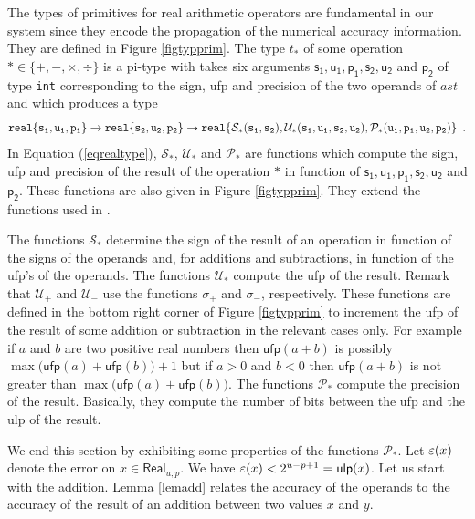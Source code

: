  
The types of primitives for real arithmetic operators are fundamental in our system since they encode
the propagation of the numerical accuracy information. They are defined in Figure \ref{figtypprim}.
The type $t_\ast$ of some operation $\ast\in\{+,-,\times,\div\}$ is a pi-type with takes
six arguments $\mathsf{s_1,u_1,p_1,s_2,u_2}$ and $\mathsf{p_2}$ of type \texttt{int} corresponding to the sign, \textsf{ufp} and precision of
the two operands of $ast$ and which produces a type
\begin{equation}\label{eqrealtype}
\mathtt{real\{s_1,u_1,p_1\}}\rightarrow\mathtt{real\{s_2,u_2,p_2\}}
\rightarrow\mathtt{real\{\mathcal{S}_\ast(\mathtt{s_1},\mathtt{s_2}),\mathcal{U}_\ast(\mathtt{s_1},\mathtt{u_1},\mathtt{s_2},\mathtt{u_2}),\mathcal{P}_\ast(\mathtt{u_1},\mathtt{p_1},\mathtt{u_2},\mathtt{p_2})\}}\enspace .
\end{equation}
In Equation (\ref{eqrealtype}), $\mathcal{S}_\ast$, $\mathcal{U}_\ast$ and $\mathcal{P}_\ast$
are functions which compute the sign, \textsf{ufp} and precision of the result of
the operation $\ast$ in function of  $\mathsf{s_1,u_1,p_1,s_2,u_2}$ and $\mathsf{p_2}$.
These functions are also given in Figure \ref{figtypprim}. They extend the functions
used in \cite{Mar17}.

The functions $\mathcal{S}_\ast$
determine the sign of the result of an operation in function of the signs of the operands and,
for additions and subtractions, in function of the \textsf{ufp}'s of the operands.
The functions $\mathcal{U}_\ast$ compute the \textsf{ufp} of the result.
Remark that $\mathcal{U}_+$ and $\mathcal{U}_-$ use the functions $\sigma_+$ and $\sigma_-$,
respectively. These functions are defined in the bottom right corner of Figure \ref{figtypprim}
to increment the \textsf{ufp} of the result of some addition or subtraction in the relevant cases only.
For example if $a$ and $b$ are two positive real numbers then $\mathsf{ufp}(a+b)$ is possibly 
$\max\big(\mathsf{ufp}(a)+\mathsf{ufp}(b)\big)+1$ but if $a>0$ and $b<0$ then
$\mathsf{ufp}(a+b)$ is not greater than $\max\big(\mathsf{ufp}(a)+\mathsf{ufp}(b)\big)$.
The functions $\mathcal{P}_\ast$ compute the precision of the result. Basically,
they compute the number of bits between the \textsf{ufp} and the \textsf{ulp} 
of the result. 

We end this section by exhibiting some properties of the functions
$\mathcal{P}_\ast$. 
Let
$\varepsilon(x)$ denote the error on $x\in\mathsf{Real}_{u,p}$. We have $\varepsilon(x)< 2^{u-p+1}=\mathsf{ulp}(x)$.
Let us start with the addition. Lemma \ref{lemadd} relates the accuracy of the operands to the accuracy
of the result of an addition between two values $x$ and $y$.

